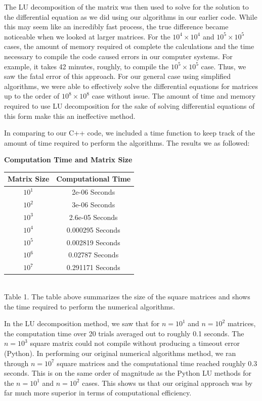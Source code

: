 \documentclass{article}
\begin{document}
The LU decomposition of the matrix was then used to solve for the solution to the differential equation as we did using our algorithms in our earlier code. While this may seem like an incredibly fast process, the true difference became noticeable when we looked at larger matrices. For the $10^{4}\times 10^{4}$ and $10^{5}\times 10^{5}$ cases, the amount of memory required ot complete the calculations and the time necessary to compile the code caused errors in our computer systems. For example, it takes 42 minutes, roughly, to compile the $10^{5}\times 10^{5}$ case. Thus, we saw the fatal error of this approach. For our general case using simplified algorithms, we were able to effectively solve the differential equations for matrices up to the order of $10^{8}\times 10^{8}$ case without issue. The amount of time and memory required to use LU decomposition for the sake of solving differential equations of this form make this an ineffective method. 



In comparing to our C++ code, we included a time function to keep track of the amount of time required to perform the algorithms. The results we as followed:


\begin{center}
	\textbf{Computation Time and Matrix Size}\\
	\centering
	\begin{tabular}{|c|c|}
		\hline
		Matrix Size & Computational Time\\
		\hline
		$10^{1}$ &2e-06 Seconds\\
		\hline
		$10^{2}$ &3e-06 Seconds\\
		\hline
		$10^{3}$ & 2.6e-05 Seconds\\
		\hline
		$10^{4}$ & 0.000295 Seconds\\
		\hline
		$10^{5}$ & 0.002819 Seconds\\
		\hline
		$10^{6}$ & 0.02787 Seconds\\
		\hline
		$10^{7}$ & 0.291171 Seconds\\
		\hline
	\end{tabular}
\\ Table 1. The table above summarizes the size of the square matrices and shows the time required to perform the numerical algorithms.

\end{center}

In the LU decomposition method, we saw that for $n=10^{1}$ and $n=10^{2}$ matrices, the computation time over 20 trials averaged out to roughly 0.1 seconds. The $n=10^{3}$ square matrix could not compile without producing a timeout error (Python). In performing our original numerical algorithms method, we ran through $n=10^{7}$ square matrices and the computational time reached roughly 0.3 seconds. This is on the same order of magnitude as the Python LU methods for the $n=10^{1}$ and $n=10^{2}$ cases. This shows us that our original approach was by far much more superior in terms of computational efficiency.
\end{document}

